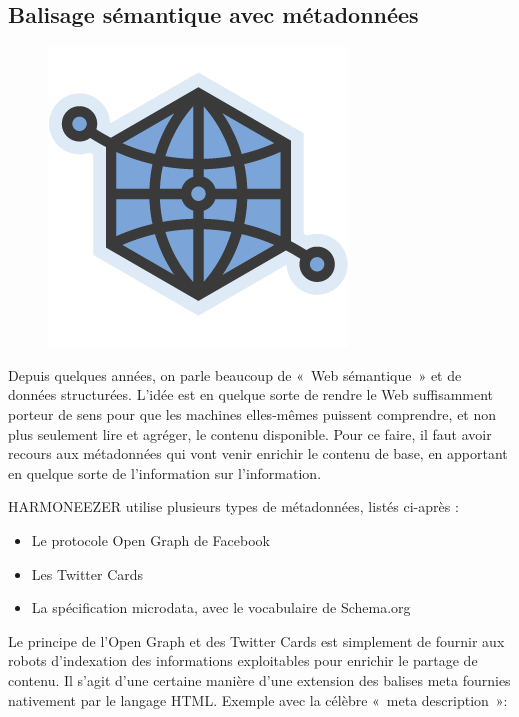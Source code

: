 \documentclass[a4paper,12pt]{article}
\begin{document}
\subsection{Balisage sémantique avec métadonnées}

\begin{figure}[!h]
  \begin{center}
    \includegraphics[scale=0.2]{logo-opengraph.png}
  \end{center}
\end{figure}


Depuis quelques années, on parle beaucoup de «~Web sémantique~» et de données structurées. L'idée est en quelque sorte de rendre le Web suffisamment porteur de sens pour que les machines elles-mêmes puissent comprendre, et non plus seulement lire et agréger, le contenu disponible. Pour ce faire, il faut avoir recours aux métadonnées qui vont venir enrichir le contenu de base, en apportant en quelque sorte de l'information sur l'information.

\newpage

HARMONEEZER utilise plusieurs types de métadonnées, listés ci-après :

\begin{itemize}
 \item{Le protocole Open Graph de Facebook}
 \item{Les Twitter Cards}
 \item{La spécification microdata, avec le vocabulaire de Schema.org}
\end{itemize}

Le principe de l'Open Graph et des Twitter Cards est simplement de fournir aux robots d'indexation des informations exploitables pour enrichir le partage de contenu. Il s'agit d'une certaine manière d'une extension des balises meta fournies nativement par le langage HTML. Exemple avec la célèbre «~meta description~»:
\end{document}
